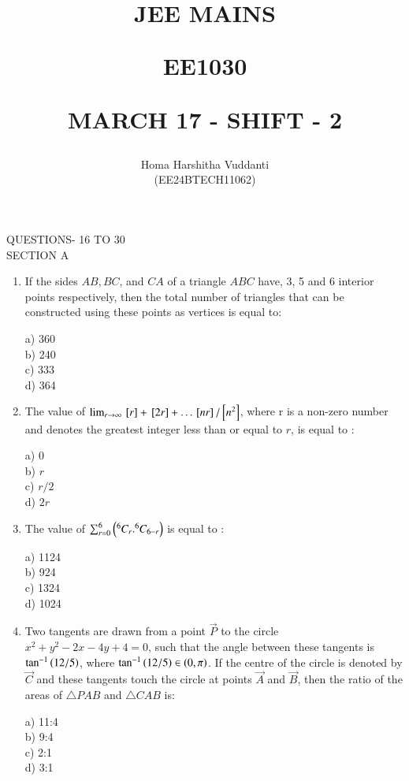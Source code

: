 \documentclass[journal]{IEEEtran}
\begin{document}


\title{
JEE MAINS

\large{EE1030}

MARCH 17 - SHIFT - 2
}
\author{Homa Harshitha Vuddanti

(EE24BTECH11062)
}	

\maketitle

\bigskip

\renewcommand{\thefigure}{\theenumi}
\renewcommand{\thetable}{\theenumi}
QUESTIONS- 16 TO 30\\
SECTION A
\begin{enumerate}
   
\item If the sides $AB, BC$, and $CA$ of a triangle $ABC$ have, 3, 5 and 6 interior points respectively, then the total number of triangles that can be constructed using these points as vertices is equal to:
\begin{multicols}{4}
    a) 360\\
    b) 240\\
    c) 333\\
    d) 364
\end{multicols}
 \item The value of $\lim_{r \to \infty}{}\left[r\right]+{}\left[2r\right]+\dots{}\left[nr\right]/{}\left[n^2\right]$, where r is a non-zero number and  denotes the greatest integer less than or equal to $r$, is equal to :
 \begin{multicols}{4}
     a) 0\\
     b) $r$\\
     c) $r/2$\\
     d) $2r$
 \end{multicols}
 
 \item The value of $\sum_{r=0}^{6}\left(^6C_r.^6C_{6-r}\right)$ is equal to :
 \begin{multicols}{4}
    a) 1124\\
    b) 924\\
    c) 1324\\
    d) 1024
 \end{multicols}
 
\item Two tangents are drawn from a point $\vec{P}$ to the circle $x^2 + y^2 -2x-4y+4=0$, such that the angle between these tangents is  $\tan^{-1}\left(12/5\right)$, where $\tan^{-1}\left(12/5\right)\in \left(0,\pi\right)$. If the centre of the circle is denoted by $\vec{C}$ and these tangents touch the circle at points $\vec{A}$ and $\vec{B}$, then the ratio of the areas of $\triangle PAB$ and $\triangle CAB$ is:
\begin{multicols}{4}
    a) 11:4\\
    b) 9:4\\
    c) 2:1\\
    d) 3:1
\end{multicols}


\end{enumerate}
\end{document}
